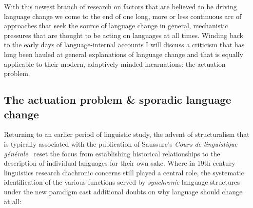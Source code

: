 


With this newest branch of research on factors that are believed to be driving language change we come to the end of one long, more or less continuous arc of approaches that seek the source of language change in general, mechanistic pressures that are thought to be acting on languages at all times. Winding back to the early days of language-internal accounts I will discuss a criticism that has long been hauled at general explanations of language change and that is equally applicable to their modern, adaptively-minded incarnations: the actuation problem.

\subsection{The actuation problem \& sporadic language change}
\label{sec:actuationproblem}

Returning to an earlier period of linguistic study, the advent of structuralism that is typically associated with the publication of Saussure's \emph{Cours de linguistique générale}~\citeyearpar{Saussure1916} reset the focus from establishing historical relationships to the description of individual languages for their own sake. %
Where in 19th century linguistics research diachronic concerns still played a central role, the systematic identification of the various functions served by \emph{synchronic} language structures under the new paradigm cast additional doubts on why language should change at all:

